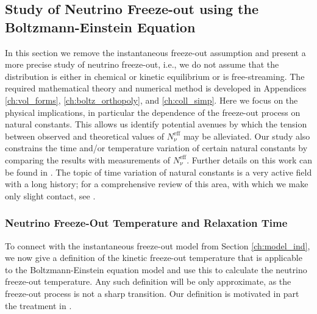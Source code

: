 \subsection{Study of Neutrino Freeze-out using  the Boltzmann-Einstein Equation}\label{ch:param_studies}
In this section we remove the instantaneous freeze-out assumption  and present a more precise study of  neutrino freeze-out, i.e., we do not assume that the distribution is either in chemical or kinetic equilibrium or is free-streaming.
The required mathematical theory and numerical method is developed in Appendices \ref{ch:vol_forms}, \ref{ch:boltz_orthopoly}, and \ref{ch:coll_simp}.  Here we focus on the physical implications, in particular the dependence of the freeze-out process on natural constants. This allows us identify potential avenues by which the tension between observed and theoretical values of $N^{\mathrm{eff}}_\nu$ may be alleviated.   Our study also constrains the time and/or temperature variation of certain natural constants by comparing the results with measurements of $N_\nu^{\mathrm{eff}}$. Further details on this work can be found in \cite{Birrell:2014uka}. The topic of time variation of natural constants is a very active field with a long history; for a comprehensive review of this area, with which we make only slight contact,  see \cite{Uzan:2010pm}.  







\subsubsection{Neutrino Freeze-Out Temperature and Relaxation Time} 
To connect with the instantaneous freeze-out model from Section \ref{ch:model_ind}, we now give a definition of the kinetic freeze-out temperature that is applicable to the Boltzmann-Einstein equation model and use this to calculate the neutrino freeze-out temperature. Any such definition will be only approximate, as the freeze-out process is not a sharp transition.  Our definition is motivated in part the treatment in \cite{Kolb:1990vq}. 

